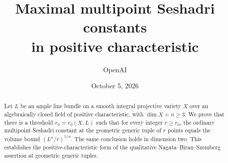 \documentclass[11pt]{article}
\title{Maximal multipoint Seshadri constants\\in positive characteristic}
\author{OpenAI}
\date{October 5, 2026}
\begin{document}
\maketitle
\begin{abstract}
Let $L$ be an ample line bundle on a smooth integral projective variety $X$
over an algebraically closed field of positive characteristic, with
$\dim X=n\ge3$. We prove that there is a threshold $r_0=r_0(X,L)$ such that
for every integer $r\ge r_0$, the ordinary multipoint Seshadri constant at
the geometric generic tuple of $r$ points equals the volume bound
$(L^n/r)^{1/n}$. The same conclusion holds in dimension two. This establishes
the positive-characteristic form of the qualitative Nagata--Biran--Szemberg
assertion at geometric generic tuples.
\end{abstract}







\begingroup\raggedright{}

\endgroup
\end{document}
